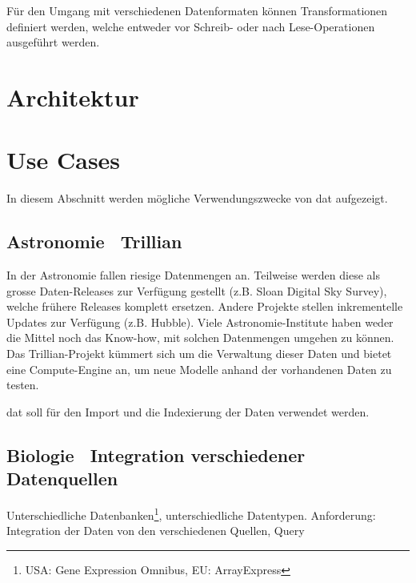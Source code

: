 Für den Umgang mit verschiedenen Datenformaten können Transformationen\cite[transformations]{dat-js-api} definiert werden, welche entweder vor Schreib- oder nach Lese-Operationen ausgeführt werden.

\section{Architektur}



\section{Use Cases}
In diesem Abschnitt werden mögliche Verwendungszwecke von \gls{dat} aufgezeigt.

\subsection{Astronomie \textendash\ Trillian} 
In der Astronomie fallen riesige Datenmengen an. Teilweise werden diese als grosse Daten-Releases zur Verfügung gestellt (z.B. Sloan Digital Sky Survey), welche frühere Releases komplett ersetzen. Andere Projekte stellen inkrementelle Updates zur Verfügung (z.B. Hubble). Viele Astronomie-Institute haben weder die Mittel noch das Know-how, mit solchen Datenmengen umgehen zu können. Das Trillian-Projekt kümmert sich um die Verwaltung dieser Daten und bietet eine Compute-Engine an, um neue Modelle anhand der vorhandenen Daten zu testen.

dat soll für den Import und die Indexierung der Daten verwendet werden.

\subsection{Biologie \textendash\ Integration verschiedener Datenquellen} 
Unterschiedliche Datenbanken\footnote{USA: Gene Expression Omnibus, EU: ArrayExpress}, unterschiedliche Datentypen. Anforderung: Integration der Daten von den verschiedenen Quellen, Query
\xxx[Ausformulieren]




